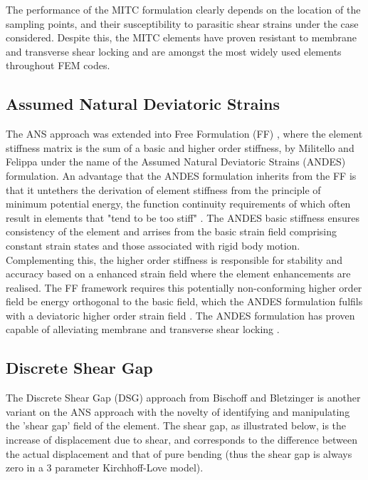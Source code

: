 The performance of the MITC formulation clearly depends on the location of the sampling points, and their susceptibility to parasitic shear strains under the case considered. Despite this, the MITC elements have proven resistant to membrane and transverse shear locking \cite{Bathe86} and are amongst the most widely used elements throughout FEM codes.

\subsection{Assumed Natural Deviatoric Strains}

The ANS approach was extended into Free Formulation (FF) \cite{Bergan84}, where the element stiffness matrix is the sum of a basic and higher order stiffness, by Militello and Felippa \cite{FELIPPA1990} under the name of the Assumed Natural Deviatoric Strains (ANDES) formulation. An advantage that the ANDES formulation inherits from the FF is that it untethers the derivation of element stiffness from the principle of minimum potential energy, the function continuity requirements of which often result in elements that "tend to be too stiff" \cite{Bergan84}. The ANDES basic stiffness ensures consistency of the element and arrises from the basic strain field comprising constant strain states and those associated with rigid body motion. Complementing this, the higher order stiffness is responsible for stability and accuracy \cite{Felippa2003} based on a enhanced strain field where the element enhancements are realised. The FF framework requires this potentially non-conforming higher order field be energy orthogonal to the basic field, which the ANDES formulation fulfils with a deviatoric higher order strain field \cite{felippa2002fitting}.  The ANDES formulation has proven capable of alleviating membrane and transverse shear locking \cite{Mostafa11}.

\subsection{Discrete Shear Gap}

The Discrete Shear Gap (DSG) approach from Bischoff and Bletzinger \cite{Ble00} \cite{Bis04} is another variant on the ANS approach with the novelty of identifying and manipulating the 'shear gap' field of the element. The shear gap, as illustrated below, is the increase of displacement due to shear, and corresponds to the difference between the actual displacement and that of pure bending (thus the shear gap is always zero in a 3 parameter Kirchhoff-Love model).

